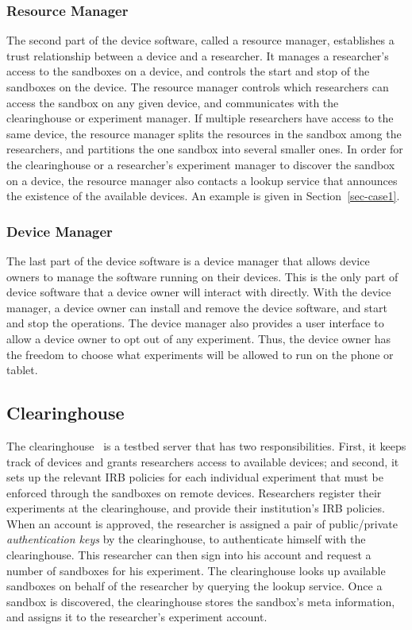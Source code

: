 \subsubsection{Resource Manager} The second part of the device software, called a resource manager, 
establishes a trust relationship between a device and a researcher. It 
manages a researcher's access to the sandboxes on a device, and
controls the start and stop of the sandboxes on the device. The 
resource manager controls which researchers can access the 
sandbox on any given device, and communicates with the clearinghouse
or experiment manager. If multiple researchers have access to 
the same device, the resource manager splits the resources in the 
sandbox among the researchers, and partitions the one sandbox 
into several smaller ones. In order for the clearinghouse or a 
researcher's experiment manager to discover the sandbox on a 
device, the resource manager also contacts a lookup service that 
announces the existence of the available devices. An example is 
given in Section~\ref{sec-case1}.

\subsubsection{Device Manager} The last part of the device software is a device manager that 
allows device owners to manage the software running on their 
devices. This is the only part of device software that a device owner 
will interact with directly. With the device manager, a device owner  
can install and remove the device software, and start and stop the 
operations. The device manager also provides a user interface to 
allow a device owner to opt out of any experiment. Thus, the device 
owner has the freedom to choose what experiments will be allowed 
to run on the phone or tablet.


\subsection{Clearinghouse}\label{sec-ch}
The clearinghouse~\cite{ch} is a testbed server that has two 
responsibilities. First, it keeps track of devices and grants 
researchers access to available devices; and second, it
sets up the relevant IRB policies for each individual experiment that 
must be enforced through the sandboxes on remote devices.
Researchers register their experiments at the clearinghouse, and 
provide their institution's IRB 
policies. When an account is approved, the researcher is assigned 
a pair of public/private \textit{authentication keys} by the 
clearinghouse, to authenticate himself with the clearinghouse. This
researcher can then sign into his account and request a 
number of sandboxes for his experiment. The clearinghouse 
looks up available sandboxes on behalf of the researcher by 
querying the lookup service. Once a sandbox is discovered, the 
clearinghouse stores the sandbox's meta information, 
and assigns it to the researcher's experiment account. 

